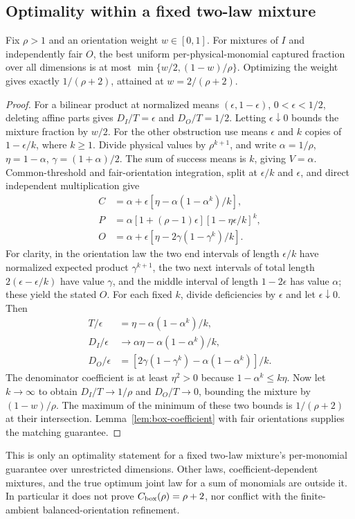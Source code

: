 \subsection{Optimality within a fixed two-law mixture}
\begin{proposition}
\label{prop:fixed-mixture-optimal}
Fix $\rho>1$ and an orientation weight $w\in[0,1]$. For mixtures of
$I$ and independently fair $O$, the best uniform per-physical-monomial
captured fraction over all dimensions is at most
$\min\{w/2,(1-w)/\rho\}$. Optimizing the weight gives exactly
$1/(\rho+2)$, attained at $w=2/(\rho+2)$.
\end{proposition}
\begin{proof}
For a bilinear product at normalized means $(\epsilon,1-\epsilon)$,
$0<\epsilon<1/2$, deleting affine parts gives
$D_I/T=\epsilon$ and $D_O/T=1/2$. Letting $\epsilon\downarrow0$
bounds the mixture fraction by $w/2$.
For the other obstruction use means $\epsilon$ and $k$ copies of
$1-\epsilon/k$, where $k\ge1$. Divide physical values by $\rho^{k+1}$,
and write $\alpha=1/\rho$, $\eta=1-\alpha$, $\gamma=(1+\alpha)/2$.
The sum of success means is $k$, giving $V=\alpha$.
Common-threshold and fair-orientation integration, split at
$\epsilon/k$ and $\epsilon$, and direct independent multiplication give
\[
 \begin{split}
 C&=\alpha+\epsilon[\eta-\alpha(1-\alpha^k)/k],\\
 P&=\alpha[1+(\rho-1)\epsilon][1-\eta\epsilon/k]^k,\\
 O&=\alpha+\epsilon[\eta-2\gamma(1-\gamma^k)/k].
 \end{split}
\]
For clarity, in the orientation law the two end intervals of length
$\epsilon/k$ have normalized expected product $\gamma^{k+1}$,
the two next intervals of total length $2(\epsilon-\epsilon/k)$
have value $\gamma$, and the middle interval of length $1-2\epsilon$
has value $\alpha$; these yield the stated $O$.
For each fixed $k$, divide deficiencies by $\epsilon$ and let
$\epsilon\downarrow0$. Then
\[
 \begin{split}
 T/\epsilon&=\eta-\alpha(1-\alpha^k)/k,\\
 D_I/\epsilon&\longrightarrow\alpha\eta-\alpha(1-\alpha^k)/k,\\
 D_O/\epsilon&=[2\gamma(1-\gamma^k)-\alpha(1-\alpha^k)]/k.
 \end{split}
\]
The denominator coefficient is at least $\eta^2>0$ because
$1-\alpha^k\le k\eta$. Now let $k\to\infty$ to obtain
$D_I/T\to1/\rho$ and $D_O/T\to0$, bounding the mixture by
$(1-w)/\rho$. The maximum of the minimum of these two bounds is
$1/(\rho+2)$ at their intersection. Lemma~\ref{lem:box-coefficient}
with fair orientations supplies the matching guarantee.
\end{proof}
This is only an optimality statement for a fixed two-law mixture's
per-monomial guarantee over unrestricted dimensions. Other laws,
coefficient-dependent mixtures, and the true optimum joint law for a
sum of monomials are outside it. In particular it does not prove
$C_{\rm box}(\rho)=\rho+2$, nor conflict with the finite-ambient
balanced-orientation refinement.
